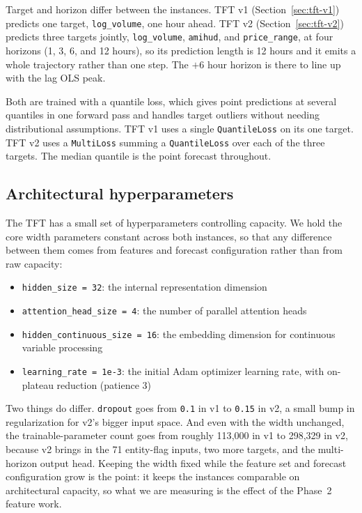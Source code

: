 Target and horizon differ between the instances. TFT v1 (Section~\ref{sec:tft-v1}) predicts one target, \texttt{log\_volume}, one hour ahead. TFT v2 (Section~\ref{sec:tft-v2}) predicts three targets jointly, \texttt{log\_volume}, \texttt{amihud}, and \texttt{price\_range}, at four horizons (1, 3, 6, and 12 hours), so its prediction length is 12 hours and it emits a whole trajectory rather than one step. The $+6$ hour horizon is there to line up with the lag OLS peak.

Both are trained with a quantile loss, which gives point predictions at several quantiles in one forward pass and handles target outliers without needing distributional assumptions. TFT v1 uses a single \texttt{QuantileLoss} on its one target. TFT v2 uses a \texttt{MultiLoss} summing a \texttt{QuantileLoss} over each of the three targets. The median quantile is the point forecast throughout.

\subsection{Architectural hyperparameters}\label{sec:tft-hyperparams}

The TFT has a small set of hyperparameters controlling capacity. We hold the core width parameters constant across both instances, so that any difference between them comes from features and forecast configuration rather than from raw capacity:

\begin{itemize}
  \item \texttt{hidden\_size = 32}: the internal representation dimension
  \item \texttt{attention\_head\_size = 4}: the number of parallel attention heads
  \item \texttt{hidden\_continuous\_size = 16}: the embedding dimension for continuous variable processing
  \item \texttt{learning\_rate = 1e-3}: the initial Adam optimizer learning rate, with on-plateau reduction (patience 3)
\end{itemize}

Two things do differ. \texttt{dropout} goes from \texttt{0.1} in v1 to \texttt{0.15} in v2, a small bump in regularization for v2's bigger input space. And even with the width unchanged, the trainable-parameter count goes from roughly 113{,}000 in v1 to 298{,}329 in v2, because v2 brings in the 71 entity-flag inputs, two more targets, and the multi-horizon output head. Keeping the width fixed while the feature set and forecast configuration grow is the point: it keeps the instances comparable on architectural capacity, so what we are measuring is the effect of the Phase~2 feature work.


